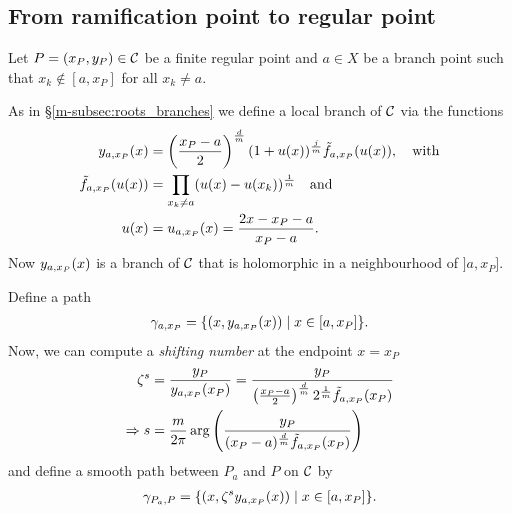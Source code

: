 \documentclass[main.tex]{subfiles}
\begin{document}
  \subsection{From ramification point to regular point}\label{subsec:ajm_finite}

   Let $P = (x_P,y_P) \in \mathcal{C}$ be a finite regular point and $a \in X$ be a branch point such that $x_k \not\in [a,x_P]$ for all $x_k \ne a$.

  As in \S \ref{m-subsec:roots_branches} we define a local branch of $\mathcal{C}$ via the functions
  \begin{align}\label{def:yax}
  \begin{split}
   y_{a,x_P}(x)  & =  \left(\frac{x_P-a}{2}\right)^{\frac{d}{m}}  (1 + u(x))^{\frac{j}{m}}  \tilde{f}_{a,x_P}(u(x)), \quad \text{with} \\
   \tilde{f}_{a,x_P}(u(x))  & =  \prod_{x_k \ne a} (u(x) - u(x_k))^{\frac{1}{m}} \quad \text{and} \\
   u(x) & =  u_{a,x_P}(x) = \frac{2x-x_P-a}{x_P-a}.
   \end{split}
  \end{align}
  Now $y_{a,x_P}(x)$ is a branch of $\mathcal{C}$ that is holomorphic in a neighbourhood of $]a,x_P]$.

  Define a path
  \begin{align*}
   \gamma_{a,x_P} = \{  (x,y_{a,x_P}(x))  \mid  x \in [a,x_P]  \}.
  \end{align*}
  Now, we can compute a \emph{shifting number} at the endpoint $x=x_P$
  \begin{align*}
   \zeta^s & = \frac{y_P}{y_{a,x_P}(x_P)} = \frac{y_P}{\left(\frac{x_P-a}{2}\right)^{\frac{d}{m}} 2^{\frac{1}{m}} \tilde{f}_{a,x_P}(x_P)} \\
   \Rightarrow s & = \frac{m}{2\pi} \arg\left(  \frac{y_P}{ (x_P-a)^{\frac{d}{m}} \tilde{f}_{a,x_P}(x_P)} \right)
  \end{align*}
  and define a smooth path between $P_a$ and $P$ on $\mathcal{C}$ by
  \begin{align*}
   \gamma_{P_a,P} = \{  (x, \zeta^s y_{a,x_P}(x))  \mid  x \in [a,x_P]  \}.
  \end{align*}
\end{document}
